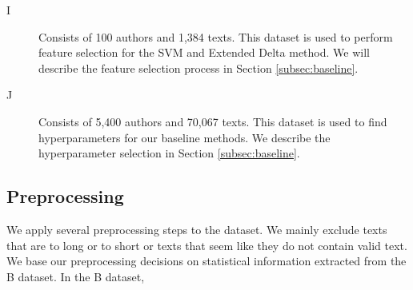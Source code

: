 \begin{description}
    \item[\gls{I}]

        Consists of 100 authors and 1,384 texts. This dataset is used to perform
        feature selection for the \gls{SVM} and Extended Delta method. We will
        describe the feature selection process in Section \ref{subsec:baseline}.

    \item[\gls{J}]

        Consists of 5,400 authors and 70,067 texts. This dataset is used to find
        hyperparameters for our baseline methods. We describe the hyperparameter
        selection in Section \ref{subsec:baseline}.

\end{description}


\subsection{Preprocessing}

We apply several preprocessing steps to the dataset. We mainly exclude texts
that are to long or to short or texts that seem like they do not contain valid
text. We base our preprocessing decisions on statistical information extracted
from the B dataset. In the B dataset,

